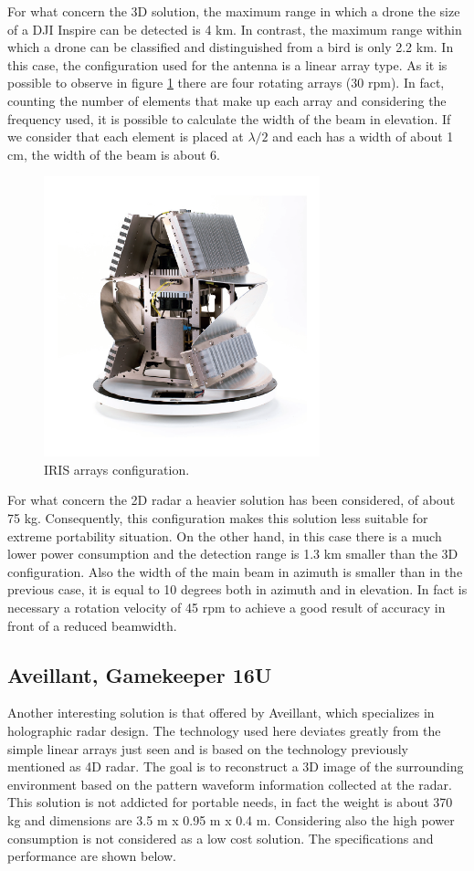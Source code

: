 \newpage
For what concern the 3D solution, the maximum range in which a drone the size of a DJI Inspire can be detected is 4 km. In contrast, the maximum range within which a drone can be classified and distinguished from a bird is only 2.2 km. In this case, the configuration used for the antenna is a linear array type. As it is possible to observe in figure \ref{irisimg} there are four rotating arrays (30 rpm). In fact, counting the number of elements that make up each array and considering the frequency used, it is possible to calculate the width of the beam in elevation. If we consider that each element is placed at $\lambda/2$  and each has a width of about 1 cm, the width of the beam is about 6\degree.

\begin{figure}[h!]
    \centering
    \includegraphics[width=8cm]{imgs/IRIS robin.png}
    \caption{IRIS arrays configuration.}
    \label{irisimg}
\end{figure}

For what concern the 2D radar a heavier solution has been considered, of about 75 kg. Consequently, this configuration makes this solution less suitable for extreme portability situation. On the other hand, in this case there is a much lower power consumption and the detection range is 1.3 km smaller than the 3D configuration. Also the width of the main beam in azimuth is smaller than in the previous case, it is equal to 10 degrees both in azimuth and in elevation. In fact is necessary a rotation velocity of 45 rpm to achieve a good result of accuracy in front of a reduced beamwidth. 

\subsection{Aveillant, Gamekeeper 16U}
Another interesting solution is that offered by Aveillant, which specializes in holographic radar design. The technology used here deviates greatly from the simple linear arrays just seen and is based on the technology previously mentioned as 4D radar. The goal is to reconstruct a 3D image of the surrounding environment based on the pattern waveform information collected at the radar. This solution is not addicted for portable needs, in fact the weight is about 370 kg and dimensions are 3.5 m x 0.95 m x 0.4 m. Considering also the high power consumption is not considered as a low cost solution. The specifications and performance are shown below.

